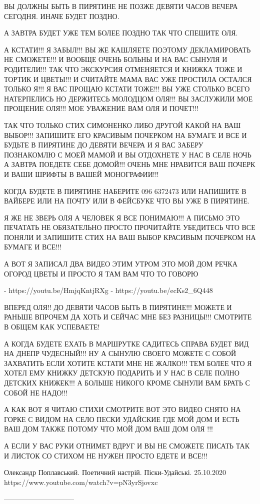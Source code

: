 ВЫ ДОЛЖНЫ БЫТЬ В ПИРЯТИНЕ НЕ ПОЗЖЕ ДЕВЯТИ ЧАСОВ ВЕЧЕРА СЕГОДНЯ. ИНАЧЕ БУДЕТ ПОЗДНО.

А ЗАВТРА БУДЕТ УЖЕ ТЕМ БОЛЕЕ ПОЗДНО ТАК ЧТО СПЕШИТЕ ОЛЯ.

А КСТАТИ!!! Я ЗАБЫЛ!!! ВЫ ЖЕ КАШЛЯЕТЕ ПОЭТОМУ ДЕКЛАМИРОВАТЬ НЕ СМОЖЕТЕ!!!
И ВООБЩЕ ОЧЕНЬ БОЛЬНЫ И НА ВАС СЫНУЛЯ И РОДИТЕЛИ!!! ТАК ЧТО ЭКСКУРСИЯ ОТМЕНЯЕТСЯ И КНИЖКА ТОЖЕ И ТОРТИК И ЦВЕТЫ!!!
И СЧИТАЙТЕ МАМА ВАС УЖЕ ПРОСТИЛА ОСТАЛСЯ ТОЛЬКО Я!!! Я ВАС ПРОЩАЮ КСТАТИ ТОЖЕ!!!
ВЫ УЖЕ СТОЛЬКО ВСЕГО НАТЕРПЕЛИСЬ НО ДЕРЖИТЕСЬ МОЛОДЦОМ ОЛЯ!!! 
ВЫ ЗАСЛУЖИЛИ МОЕ ПРОЩЕНИЕ ОЛЯ!!! МОЕ УВАЖЕНИЕ ВАМ ОЛЯ И ПОЧЕТ!!!

ТАК ЧТО ТОЛЬКО СТИХ СИМОНЕНКО ЛИБО ДРУГОЙ КАКОЙ НА ВАШ ВЫБОР!!! 
ЗАПИШИТЕ ЕГО КРАСИВЫМ ПОЧЕРКОМ НА БУМАГЕ И ВСЕ И БУДЬТЕ В ПИРЯТИНЕ ДО ДЕВЯТИ ВЕЧЕРА И Я ВАС
ЗАБЕРУ ПОЗНАКОМЛЮ С МОЕЙ МАМОЙ И ВЫ ОТДОХНЕТЕ У НАС В СЕЛЕ НОЧЬ А ЗАВТРА ПОЕДЕТЕ СЕБЕ ДОМОЙ!!!
ОЧЕНЬ МНЕ НРАВИТСЯ ВАШ ПОЧЕРК И ВАШИ ШРИФТЫ В ВАШЕЙ МОНОГРАФИИ!!!

КОГДА БУДЕТЕ В ПИРЯТИНЕ НАБЕРИТЕ 096 6372473 ИЛИ НАПИШИТЕ В ВАЙБЕРЕ ИЛИ НА
ПОЧТУ ИЛИ В ФЕЙСБУКЕ ЧТО ВЫ УЖЕ В ПИРЯТИНЕ.

Я ЖЕ НЕ ЗВЕРЬ ОЛЯ А ЧЕЛОВЕК Я ВСЕ ПОНИМАЮ!!! А ПИСЬМО ЭТО ПЕЧАТАТЬ НЕ ОБЯЗАТЕЛЬНО ПРОСТО
ПРОЧИТАЙТЕ УБЕДИТЕСЬ ЧТО ВСЕ ПОНЯЛИ И ЗАПИШИТЕ СТИХ НА ВАШ ВЫБОР КРАСИВЫМ ПОЧЕРКОМ НА БУМАГЕ И ВСЕ!!!

А ВОТ Я ЗАПИСАЛ ДВА ВИДЕО ЭТИМ УТРОМ ЭТО МОЙ ДОМ 
РЕЧКА ОГОРОД ЦВЕТЫ И ПРОСТО Я ТАМ ВАМ ЧТО ТО ГОВОРЮ

- https://youtu.be/HmjqKntjRXg
- https://youtu.be/ecKs2_6Q448

ВПЕРЕД ОЛЯ!! ДО ДЕВЯТИ ЧАСОВ БЫТЬ В ПИРЯТИНЕ!!! 
МОЖЕТЕ И РАНЬШЕ ВПРОЧЕМ ДА ХОТЬ И СЕЙЧАС МНЕ БЕЗ РАЗНИЦЫ!!!
СМОТРИТЕ В ОБЩЕМ КАК УСПЕВАЕТЕ!

А КОГДА БУДЕТЕ ЕХАТЬ В МАРШРУТКЕ САДИТЕСЬ СПРАВА БУДЕТ ВИД НА ДНЕПР ЧУДЕСНЫЙ!!!
НУ А СЫНУЛЮ СВОЕГО МОЖЕТЕ С СОБОЙ ЗАХВАТИТЬ ЕСЛИ ХОТИТЕ КСТАТИ МНЕ НЕ ЖАЛКО!!!
ТЕМ БОЛЕЕ ЧТО Я ХОТЕЛ ЕМУ КНИЖКУ ДЕТСКУЮ ПОДАРИТЬ И У НАС В СЕЛЕ ПОЛНО 
ДЕТСКИХ КНИЖЕК!!! А БОЛЬШЕ НИКОГО КРОМЕ СЫНУЛИ ВАМ БРАТЬ С СОБОЙ НЕ НАДО!!!

А КАК ВОТ Я ЧИТАЮ СТИХИ СМОТРИТЕ ВОТ ЭТО ВИДЕО 
СНЯТО НА ГОРКЕ С ВИДОМ НА СЕЛО ПЕСКИ УДАЙСКИЕ ГДЕ МОЙ ДОМ 
И ЕСТЬ ВАШ ДОМ ТАКЖЕ ПОТОМУ ЧТО МОЙ ДОМ ВАШ ДОМ ОЛЯ !!!

А ЕСЛИ У ВАС РУКИ ОТНИМЕТ ВДРУГ И ВЫ НЕ СМОЖЕТЕ ПИСАТЬ ТАК И ЛИСТОК СО СТИХОМ 
НЕ НУЖЕН ПРОСТО ЕДЕТЕ И ВСЕ!!!

Олександр Поплавський. Поетичний настрій. Піски-Удайські. 25.10.2020
https://www.youtube.com/watch?v=pN3yrSjovxc

------------------------------

